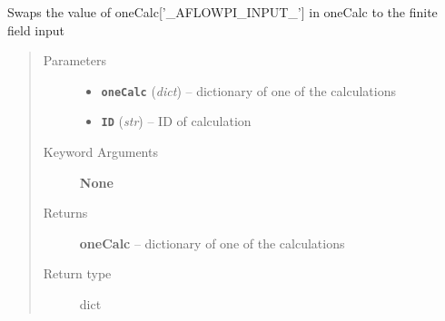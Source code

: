 \documentclass[letterpaper,10pt,english]{sphinxmanual}
\begin{document}
\begin{fulllineitems}
\label{run:run.__swap_scf_inputs}
Swaps the value of oneCalc{[}'\_AFLOWPI\_INPUT\_'{]} in oneCalc to the finite field input
\begin{quote}\begin{description}
\item[{Parameters}] \leavevmode\begin{itemize}
\item {} 
\textbf{\texttt{oneCalc}} (\emph{dict}) -- dictionary of one of the calculations

\item {} 
\textbf{\texttt{ID}} (\emph{str}) -- ID of calculation

\end{itemize}

\item[{Keyword Arguments}] \leavevmode
\textbf{None}

\item[{Returns}] \leavevmode
\textbf{oneCalc} --
dictionary of one of the calculations

\item[{Return type}] \leavevmode
dict

\end{description}\end{quote}

\end{fulllineitems}

\end{document}
